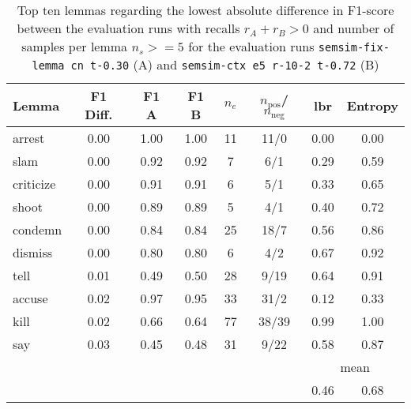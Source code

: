 \documentclass[11pt]{scrreprt}
\begin{document}
{\begin{table}[htp]
\centering
\begin{tabular}{lccccccc}
\toprule
Lemma      & F1 Diff. & F1 A & F1 B & \(n_e\) & \(n_\text{pos}\)/\(n_\text{neg}\) & \gls{lbr} & Entropy \\
\midrule
arrest     & 0.00      & 1.00           & 1.00           & 11              & 11/0    & 0.00 & 0.00 \\
slam       & 0.00      & 0.92           & 0.92           & 7               & 6/1     & 0.29 & 0.59 \\
criticize  & 0.00      & 0.91           & 0.91           & 6               & 5/1     & 0.33 & 0.65 \\
shoot      & 0.00      & 0.89           & 0.89           & 5               & 4/1     & 0.40 & 0.72 \\
condemn    & 0.00      & 0.84           & 0.84           & 25              & 18/7    & 0.56 & 0.86 \\
dismiss    & 0.00      & 0.80           & 0.80           & 6               & 4/2     & 0.67 & 0.92 \\
tell       & 0.01      & 0.49           & 0.50           & 28              & 9/19    & 0.64 & 0.91 \\
accuse     & 0.02      & 0.97           & 0.95           & 33              & 31/2    & 0.12 & 0.33 \\
kill       & 0.02      & 0.66           & 0.64           & 77              & 38/39   & 0.99 & 1.00 \\
say        & 0.03      & 0.45           & 0.48           & 31              & 9/22    & 0.58 & 0.87 \\
\cmidrule{7-8}
\multicolumn{6}{l}{} & \multicolumn{2}{c}{mean} \\
\multicolumn{6}{l}{} & 0.46 & 0.68 \\
\bottomrule
\end{tabular}
\caption{Top ten lemmas regarding the lowest absolute difference in F1-score between the evaluation runs with recalls \(r_A + r_B > 0\) and number of samples per lemma \(n_s >= 5\) for the evaluation runs \texttt{semsim-fix-lemma cn t-0.30} (A) and \texttt{semsim-ctx e5 r-10-2 t-0.72} (B)}
\label{tab:predicate-lemma-lowest-f1}
\end{table}

}
\end{document}
